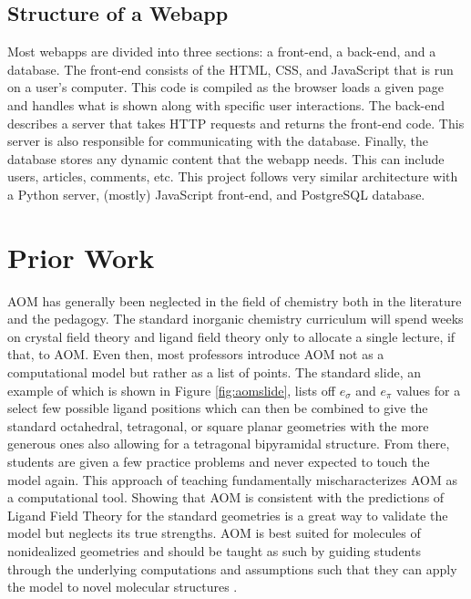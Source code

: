 \documentclass[10pt,twocolumn]{article}
\begin{document}
\subsection{Structure of a Webapp}
Most webapps are divided into three sections: a front-end, a back-end, and a database. The front-end consists of the HTML, CSS, and JavaScript that is run on a user’s computer. This code is compiled as the browser loads a given page and handles what is shown along with specific user interactions. The back-end describes a server that takes HTTP requests and returns the front-end code. This server is also responsible for communicating with the database. Finally, the database stores any dynamic content that the webapp needs. This can include users, articles, comments, etc. This project follows very similar architecture with a Python server, (mostly) JavaScript front-end, and PostgreSQL database. 

\section{Prior Work}
AOM has generally been neglected in the field of chemistry both in the literature and the pedagogy. The standard inorganic chemistry curriculum will spend weeks on crystal field theory and ligand field theory only to allocate a single lecture, if that, to AOM. Even then, most professors introduce AOM not as a computational model but rather as a list of points. The standard slide, an example of which is shown in Figure \ref{fig:aomslide}, lists off $e_\sigma$ and $e_\pi$ values for a select few possible ligand positions which can then be combined to give the standard octahedral, tetragonal, or square planar geometries with the more generous ones also allowing for a tetragonal bipyramidal structure. From there, students are given a few practice problems and never expected to touch the model again. This approach of teaching fundamentally mischaracterizes AOM as a computational tool. Showing that AOM is consistent with the predictions of Ligand Field Theory for the standard geometries is a great way to validate the model but neglects its true strengths. AOM is best suited for molecules of nonidealized geometries and should be taught as such by guiding students through the underlying computations and assumptions such that they can apply the model to novel molecular structures \cite{larsen1974}.
\end{document}
